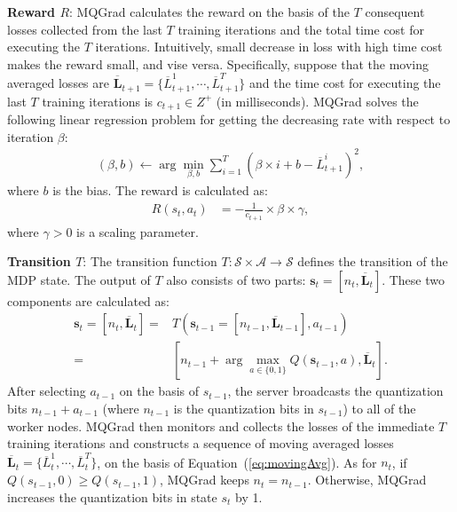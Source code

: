 \documentclass[sigconf]{acmart}
\begin{document}
\textbf{Reward $R$}: MQGrad calculates the reward on the basis of the $T$ consequent losses collected from the last $T$ training iterations and the total time cost for executing the $T$ iterations. Intuitively, small decrease in loss with high time cost makes the reward small, and vise versa. Specifically, suppose that the moving averaged losses are $\overline{\mathbf{L}}_{t+1} = \{\overline{L}_{t+1}^1, \cdots, \overline{L}_{t+1}^{T}\}$ and the time cost for executing the last $T$ training iterations is $c_{t+1}\in Z^+$ (in milliseconds). MQGrad solves the following linear regression problem for getting the decreasing rate with respect to iteration $\beta$:
\[
	\begin{split}
		(\beta, b)\leftarrow \arg\min_{\beta, b} \sum_{i=1}^{T}\left(\beta \times i + b - \overline{L}_{t+1}^i\right)^2,
	\end{split}
\]
where $b$ is the bias. The reward is calculated as:
\begin{equation}
	\begin{split}
		R({s_t}, a_t) &= -\frac{1}{c_{t+1}}\times \beta \times \gamma,
	\end{split}
\end{equation}
where $\gamma> 0$ is a scaling parameter.

\textbf{Transition $T$}: The transition function $T:\mathcal{S}\times\mathcal{A}\rightarrow \mathcal{S}$ defines the transition of the MDP state. The output of $T$ also consists of two parts: $\textbf{s}_{t} = [n_{t}, \mathbf{\overline{L}}_{t}]$. These two components are calculated as:
\begin{equation}
	\begin{split}
		\textbf{s}_{t} = [n_{t}, \mathbf{\overline{L}}_{t}] =& T(\mathbf{s}_{t-1} = [n_{t-1}, \mathbf{\overline{L}}_{t-1}], a_{t-1})\\
		= & [n_{t-1} + \arg\max_{a\in\{0, 1\}} Q(\textbf{s}_{t-1}, a), \mathbf{\overline{L}}_{t}].
	\end{split}
\end{equation}
After selecting $a_{t-1}$ on the basis of ${s}_{t-1}$, the server broadcasts the quantization bits $n_{t-1} + a_{t-1}$ (where $n_{t-1}$ is the quantization bits in ${s}_{t-1}$) to all of the worker nodes. MQGrad then monitors and collects the losses of the immediate $T$ training iterations and constructs a sequence of moving averaged losses $\mathbf{\overline{L}}_{t}=\{\overline{L}_{t}^1, \cdots, \overline{L}_{t}^{T}\}$, on the basis of Equation~(\ref{eq:movingAvg}). As for $n_{t}$, if $Q({s}_{t-1}, 0) \geq Q({s}_{t-1}, 1)$, MQGrad keeps $n_{t} = n_{t-1}$. Otherwise, MQGrad increases the quantization bits in state ${s}_{t}$ by 1.
\end{document}
